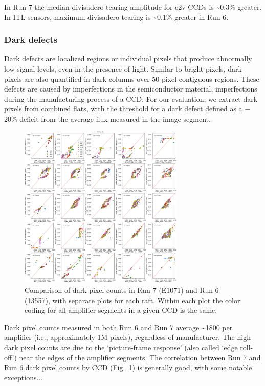 In Run 7 the median divisadero tearing amplitude for e2v CCDs is \textasciitilde0.3\% greater. In ITL sensors, maximum divisadero tearing is \textasciitilde0.1\% greater in Run 6.

\subsubsection{Dark defects}\label{dark-defects}

Dark defects are localized regions or individual pixels that produce abnormally low signal levels, even in the presence of light. Similar to bright pixels, dark pixels are also quantified in dark columns over 50 pixel contiguous regions. These
defects are caused by imperfections in the semiconductor
material, imperfections during the manufacturing process of a CCD. For our evaluation, we extract
dark pixels from combined flats, with the threshold for a dark defect
defined as a $-$20\% deficit from the average flux measured in the image segment.

\begin{figure}[H]
\begin{centering}
\includegraphics[width=0.7\textwidth]{sections/figures/baselineCharacterization/13557_E1071_DARK_PIXELS.png}
\caption{Comparison of dark pixel counts in Run 7 (E1071) and Run 6 (13557), with separate plots for each raft.  Within each plot the color coding for all amplifier segments in a given CCD is the same.}
\label{fig:dark-pixels}
\end{centering}
\end{figure}

Dark pixel counts measured in both Run 6 and Run 7 average
\textasciitilde1800 per amplifier (i.e., approximately 1M pixels), regardless of manufacturer. The
high dark pixel counts are due to the `picture-frame response' (also called `edge roll-off') 
near the edges of the amplifier segments.  The correlation between Run 7 and Run 6 dark pixel counts by CCD (Fig.~\ref{fig:dark-pixels}) is generally good, with some notable exceptions...

